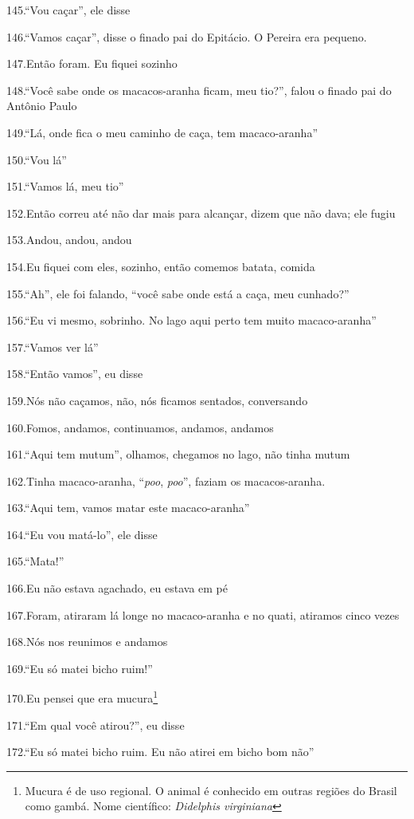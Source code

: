 145.``Vou caçar'', ele disse

146.``Vamos caçar'', disse o finado pai do Epitácio. O Pereira era
pequeno.

147.Então foram. Eu fiquei sozinho

148.``Você sabe onde os macacos-aranha ficam, meu tio?'', falou o finado
pai do Antônio Paulo

149.``Lá, onde fica o meu caminho de caça, tem macaco-aranha''

150.``Vou lá''

151.``Vamos lá, meu tio''

152.Então correu até não dar mais para alcançar, dizem que não dava; ele
fugiu

153.Andou, andou, andou

154.Eu fiquei com eles, sozinho, então comemos batata, comida

155.``Ah'', ele foi falando, ``você sabe onde está a caça, meu
cunhado?''

156.``Eu vi mesmo, sobrinho. No lago aqui perto tem muito
macaco-aranha''

157.``Vamos ver lá''

158.``Então vamos'', eu disse

159.Nós não caçamos, não, nós ficamos sentados, conversando

160.Fomos, andamos, continuamos, andamos, andamos

161.``Aqui tem mutum'', olhamos, chegamos no lago, não tinha mutum

162.Tinha macaco-aranha, ``\emph{poo}, \emph{poo}'', faziam os
macacos-aranha.

163.``Aqui tem, vamos matar este macaco-aranha''

164.``Eu vou matá-lo'', ele disse

165.``Mata!''

166.Eu não estava agachado, eu estava em pé

167.Foram, atiraram lá longe no macaco-aranha e no quati, atiramos cinco
vezes

168.Nós nos reunimos e andamos

169.``Eu só matei bicho ruim!''

170.Eu pensei que era mucura\footnote{Mucura é de uso regional. O animal
  é conhecido em outras regiões do Brasil como gambá. Nome científico:
  \emph{Didelphis virginiana}}

171.``Em qual você atirou?'', eu disse

172.``Eu só matei bicho ruim. Eu não atirei em bicho bom não''

